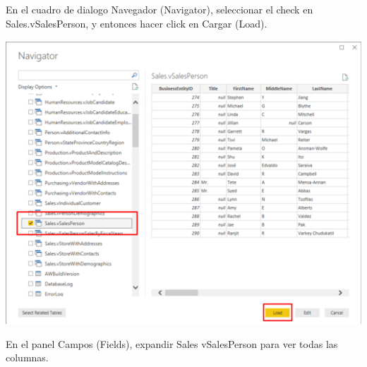 \documentclass[12pt,letterpaper]{article}
\begin{document}
En el cuadro de dialogo Navegador (Navigator), seleccionar el check en Sales.vSalesPerson, y entonces hacer
click en Cargar (Load).
\begin{center}
    \includegraphics[width=16cm]{img/7.png}  
\end{center}
En el panel Campos (Fields), expandir Sales vSalesPerson para ver todas las columnas.
\end{document}
